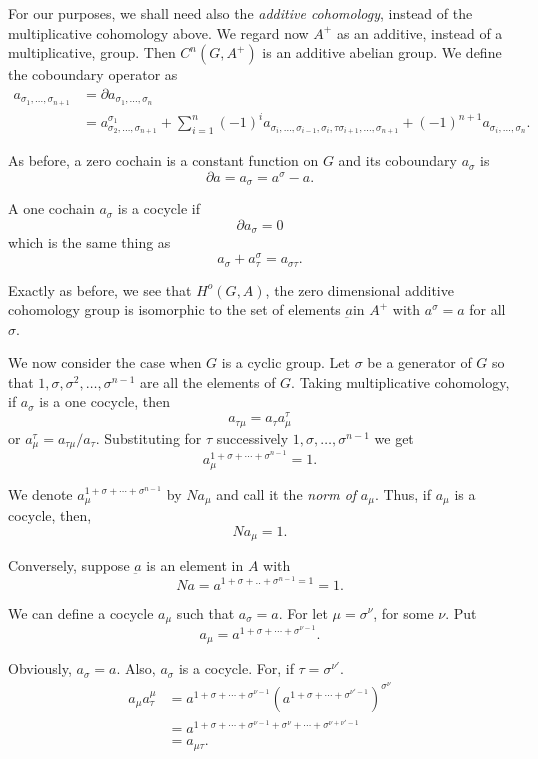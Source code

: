  For our purposes, we shall need also the \textit{additive
   cohomology}, instead of the multiplicative cohomology above. We
 regard now $A^+$ as an additive, instead of a multiplicative,
 group. Then $C^n(G,A^+)$ is an additive abelian group. We define the
 coboundary operator as 
{\fontsize{10pt}{12pt}\selectfont
 \begin{align*}
 a_{\sigma_1,\ldots,\sigma_{n+1}} & = \partial
 a_{\sigma_1,\ldots,\sigma_n} \\
& = a^{\sigma_1}_{\sigma_2
   ,\ldots,\sigma_{n+1}}+\sum^n_{i=1}(-1)^i
 a_{\sigma_i, \ldots, \sigma_{i-1}, \sigma_i,
    \tau \sigma_{i+1},\ldots,\sigma_{n+1}} + (-1)^{n+1}
 a_{\sigma_i,\ldots,\sigma_n}.   
 \end{align*}}\relax

 
 As before, a zero cochain is a constant function on $G$ and its
 coboun\-dary $a_\sigma$ is 
 $$
 \partial a = a_\sigma = a^\sigma - a.
 $$
 
 A one cochain $a_\sigma$ is a cocycle if
 $$
 \partial a_\sigma =0
 $$
 which is the same thing as 
 $$
 a_\sigma + a^\sigma_\tau =a_{\sigma \tau}.
 $$
 
 Exactly as before, we see that $H^o(G,A)$, the zero dimensional
 additive cohomology group is isomorphic to the set of elements
 $\underbar{a}$\pageoriginale in $A^+$ with $a^\sigma = a$ for all
 $\sigma$.  
 
 We now consider the case when $G$ is a cyclic group. Let $\sigma$ be
 a generator of $G$ so that $1,\sigma, \sigma^2,\ldots,\sigma^{n-1}$
 are all the elements of $G$. Taking multiplicative cohomology, if
 $a_\sigma$ is a one cocycle, then 
 $$
 a_{\tau \mu} = a_\tau a^\tau _\mu
 $$
 or $a^\tau_\mu  = a_{\tau \mu}/ a_{\tau}$. Substituting for $\tau$
 successively $1,\sigma,\ldots,\sigma^{n-1}$ we get 
 $$
 a^{1+\sigma + \cdots + \sigma^{n-1}}_{\mu}=1.  
 $$

We denote $a^{1+\sigma + \cdots + \sigma^{n-1}}_\mu$ by $N a_\mu$ and
call it the \textit{norm of} $a_\mu$. Thus, if $a_\mu$ is a cocycle,
then, 
 $$
 N a_\mu =1.
 $$
 
 Conversely, suppose $\underbar{a}$ is an element in $A$ with
 $$
 N a = a^{1+\sigma + ..+ \sigma^{n-1}=1} =1.
 $$
 
 We can define a cocycle $a_\mu$ such that $a_\sigma = a$. For let
 $\mu =\sigma^\nu$, for some $\nu$. Put 
 $$
 a_\mu =a^{1+ \sigma + \cdots +\sigma^{\nu -1}}. 
 $$

 Obviously, $a_\sigma = a$. Also, $a_\sigma $ is a cocycle. For, if
 $\tau = \sigma^{\nu'}$. 
 \begin{align*}
a_\mu a^\mu_\tau & = a^{1+\sigma + \cdots + \sigma^{\nu -1}}
(a^{1+\sigma + \cdots +\sigma^{\nu'-1}})^{\sigma^\nu}\\ 
& = a^{1+\sigma + \cdots + \sigma^{\nu -1}+\sigma^\nu + \cdots
  +\sigma^{\nu+\nu'-1}}\\ 
& = a_{\mu \tau}.
 \end{align*} 
 
